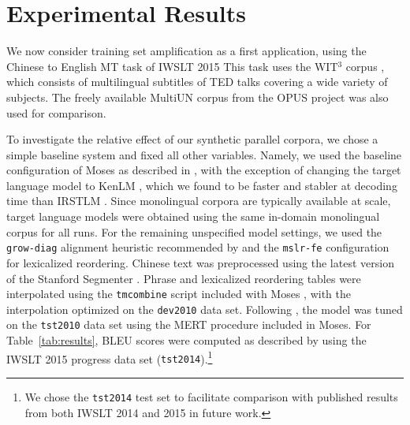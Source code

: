 


\section{Experimental Results}

\label{sec:experiments}
We now consider training set amplification as a first application, using the Chinese to English MT task of IWSLT 2015 
This task uses the WIT$^3$ corpus , which consists of multilingual subtitles of TED talks covering a wide variety of subjects. 
The freely available MultiUN corpus  from the OPUS project  was also used for comparison.

To investigate the relative effect of our synthetic parallel corpora, we chose a simple baseline system and fixed all other variables.
Namely, we used the baseline configuration of Moses  as described in , with the exception of changing the target language model to KenLM , which we found to be faster and stabler at decoding time than IRSTLM .
Since monolingual corpora are typically available at scale, target language models were obtained using the same in-domain monolingual corpus for all runs.
For the remaining unspecified model settings, we used the {\small \tt grow-diag} alignment heuristic recommended by  and the {\small \tt mslr-fe} configuration for lexicalized reordering. 
Chinese text was preprocessed using the latest version of the Stanford Segmenter .
Phrase and lexicalized reordering tables were interpolated using the {\small \tt tmcombine} script included with Moses , with the interpolation optimized on the {\small \tt dev2010} data set.
Following , the model was tuned on the {\small \tt tst2010} data set using the MERT procedure included in Moses.
For Table~\ref{tab:results}, BLEU scores were computed as described by  using the IWSLT 2015 progress data set ({\small \tt tst2014}).\footnote{
    We chose the {\small \tt tst2014} test set to facilitate comparison with published results from both IWSLT 2014 and 2015 in future work.
} %

